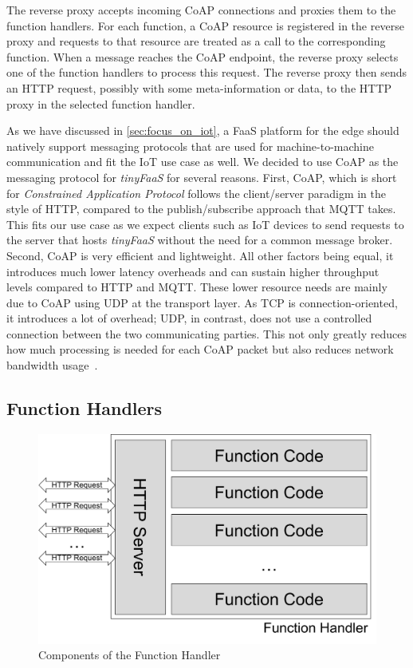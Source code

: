 The reverse proxy accepts incoming CoAP connections and proxies them to the function handlers.
For each function, a CoAP resource is registered in the reverse proxy and requests to that resource are treated as a call to the corresponding function.
When a message reaches the CoAP endpoint, the reverse proxy selects one of the function handlers to process this request.
The reverse proxy then sends an HTTP request, possibly with some meta-information or data, to the HTTP proxy in the selected function handler.

As we have discussed in \cref{sec:focus_on_iot}, a FaaS platform for the edge should natively support messaging protocols that are used for machine-to-machine communication and fit the IoT use case as well.
We decided to use CoAP as the messaging protocol for \textit{tinyFaaS} for several reasons.
First, CoAP, which is short for \textit{Constrained Application Protocol} follows the client/server paradigm in the style of HTTP, compared to the publish/subscribe approach that MQTT takes.
This fits our use case as we expect clients such as IoT devices to send requests to the server that hosts \textit{tinyFaaS} without the need for a common message broker.
Second, CoAP is very efficient and lightweight.
All other factors being equal, it introduces much lower latency overheads and can sustain higher throughput levels compared to HTTP and MQTT.
These lower resource needs are mainly due to CoAP using UDP at the transport layer.
As TCP is connection-oriented, it introduces a lot of overhead; UDP, in contrast, does not use a controlled connection between the two communicating parties.
This not only greatly reduces how much processing is needed for each CoAP packet but also reduces network bandwidth usage~\cite{Laaroussi2018-fk,Naik2017-cn}.


\subsection{Function Handlers}
\label{sec:handlers}

\begin{figure}
    \centering
    \includegraphics[width=0.66\columnwidth]{fig/functionhandler.pdf}
    \caption{Components of the Function Handler}
    \label{fig:functionhandlers}
\end{figure}

